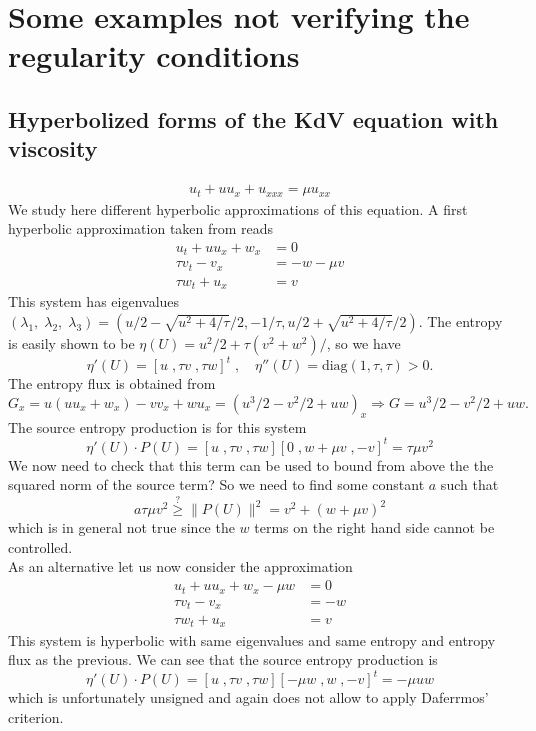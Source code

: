 \documentclass{article}
\theoremstyle{plain}
\theoremstyle{definition}
\numberwithin{theorem}{section}
\begin{document}
\section{Some examples not verifying the regularity conditions}

\subsection{Hyperbolized forms of the KdV equation with viscosity}

\begin{align}
    u_t + u u_x + u_{xxx} = \mu u_{xx}
\end{align}
We study here different hyperbolic approximations of this equation. 
A first  hyperbolic approximation taken from \cite{giesselmann2025convergence} reads  
\begin{subequations} \label{vkdvh1}
\begin{align}
    u_t + u u_x  + w_x & = 0 \\
    \tau v_t   - v_x  & = -w -\mu v\\
        \tau w_t +  u_x & = v
\end{align}
\end{subequations}
This system has eigenvalues $(\lambda_1,\; \lambda_2,\;\lambda_3)=(u/2 - \sqrt{u^2+4/\tau}/2, -1/\tau, u/2+ \sqrt{u^2+4/\tau}/2)$.
The entropy is easily shown to be $\eta(U) = u^2/2 + \tau (v^2+w^2)/$, so we have 
$$
\eta'(U)= [u\;, \tau v\;, \tau w]^t\;,\quad 
\eta''(U) =  \text{diag}(1,\tau,\tau) >0.
$$
The entropy flux is obtained from
$$
G_x =u (u u_x  + w_x) - v v_x + wu_x = ( u^3/2 - v^2/2  + uw )_x\Rightarrow G = u^3/2 - v^2/2  + uw.
$$
The source entropy production is for this system
$$
\eta'(U)\cdot P(U) = [u\;, \tau v\;, \tau w] [0\;, w +\mu v\;, -v]^t = \tau \mu v^2  
$$
We now need to check that this term can be used to bound from above the the squared norm of the source term?
So we need to find some constant $a$ such that  
$$
  a \tau \mu   v^2 \stackrel{?}{\ge} \|P(U)\|^2 = v^2 + (w +\mu v)^2 
$$
which is in general not true since the $w$ terms on the right hand side cannot be controlled.\\



As an alternative let us now consider the approximation
\begin{subequations} \label{vkdvh2}
\begin{align}
    u_t + u u_x  + w_x -\mu w & = 0 \\
    \tau v_t - v_x & = -w\\
        \tau w_t +  u_x & = v
\end{align}
\end{subequations} 
This system is hyperbolic with  same eigenvalues  and same entropy and entropy flux as the previous. 
We can see that  the source entropy production is
$$
\eta'(U)\cdot P(U) = [u\;, \tau v\;, \tau w] [-\mu w\;, w\;, -v]^t =- \mu u w
$$
which is unfortunately unsigned and again does not allow to apply Daferrmos' criterion.\\
\end{document}

